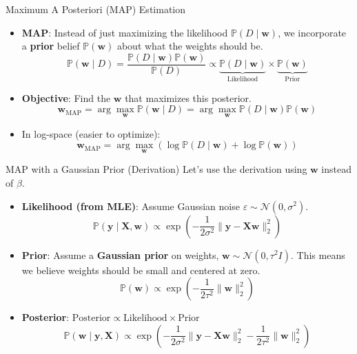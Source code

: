 \documentclass[serif, aspectratio=169]{beamer}
\begin{document}
\begin{frame}{Maximum A Posteriori (MAP) Estimation}
    \begin{itemize}
        \item \textbf{MAP}: Instead of just maximizing the likelihood $\mathbb{P}(D \mid \mathbf{w})$, we incorporate a \textbf{prior} belief $\mathbb{P}(\mathbf{w})$ about what the weights should be.
        \[
        \mathbb{P}(\mathbf{w} \mid D) = \frac{\mathbb{P}(D \mid \mathbf{w}) \mathbb{P}(\mathbf{w})}{\mathbb{P}(D)} 
        \propto 
        \underbrace{\mathbb{P}(D \mid \mathbf{w})}_{\text{Likelihood}} 
        \times 
        \underbrace{\mathbb{P}(\mathbf{w})}_{\text{Prior}}
        \]
        \item \textbf{Objective}: Find the $\mathbf{w}$ that maximizes this posterior.
        \[
        \mathbf{w}_{\text{MAP}} = \arg\max_{\mathbf{w}} \mathbb{P}(\mathbf{w} \mid D) = \arg\max_{\mathbf{w}} \mathbb{P}(D \mid \mathbf{w}) \mathbb{P}(\mathbf{w})
        \]
        \item In log-space (easier to optimize):
        \[
        \mathbf{w}_{\text{MAP}} = \arg\max_{\mathbf{w}} \left( \log \mathbb{P}(D \mid \mathbf{w}) + \log \mathbb{P}(\mathbf{w}) \right)
        \]
    \end{itemize}
\end{frame}

\begin{frame}{MAP with a Gaussian Prior (Derivation)}
    Let's use the derivation using $\mathbf{w}$ instead of $\beta$.
    \begin{itemize}
        \item \textbf{Likelihood (from MLE)}: Assume Gaussian noise $\varepsilon \sim \mathcal{N}(0, \sigma^2)$.
        \[
        \mathbb{P}(\mathbf{y} \mid \mathbf{X}, \mathbf{w}) \propto \exp\left( -\frac{1}{2\sigma^2} \|\mathbf{y} - \mathbf{Xw}\|_2^2 \right)
        \]
        \item \textbf{Prior}: Assume a \textbf{Gaussian prior} on weights, $\mathbf{w} \sim \mathcal{N}(0, \tau^2 I)$. This means we believe weights should be small and centered at zero.
        \[
        \mathbb{P}(\mathbf{w}) \propto \exp\left( -\frac{1}{2\tau^2} \|\mathbf{w}\|_2^2 \right)
        \]
        \item \textbf{Posterior}: $\text{Posterior} \propto \text{Likelihood} \times \text{Prior}$
        \[
        \mathbb{P}(\mathbf{w} \mid \mathbf{y}, \mathbf{X}) \propto 
        \exp\left( 
            -\frac{1}{2\sigma^2} \|\mathbf{y} - \mathbf{Xw}\|_2^2 
            - \frac{1}{2\tau^2} \|\mathbf{w}\|_2^2 
        \right)
        \]
    \end{itemize}
\end{frame}
\end{document}
